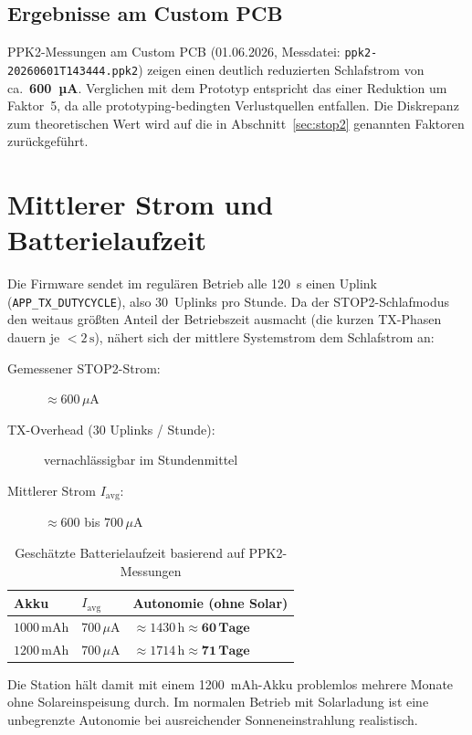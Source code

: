 \subsection*{Ergebnisse am Custom PCB}

PPK2-Messungen am Custom PCB (01.06.2026, Messdatei: \texttt{ppk2-20260601T143444.ppk2}) zeigen einen deutlich reduzierten Schlafstrom von ca.\ \textbf{600~µA}. Verglichen mit dem Prototyp entspricht das einer Reduktion um Faktor~5, da alle prototyping-bedingten Verlustquellen entfallen. Die Diskrepanz zum theoretischen Wert wird auf die in Abschnitt~\ref{sec:stop2} genannten Faktoren zurückgeführt.

\section*{Mittlerer Strom und Batterielaufzeit}
\label{sec:stop2}

Die Firmware sendet im regulären Betrieb alle 120~s einen Uplink (\texttt{APP\_TX\_DUTYCYCLE}), also 30~Uplinks pro Stunde. Da der STOP2-Schlafmodus den weitaus größten Anteil der Betriebszeit ausmacht (die kurzen TX-Phasen dauern je $< 2\,\text{s}$), nähert sich der mittlere Systemstrom dem Schlafstrom an:

\begin{description}
  \item[Gemessener STOP2-Strom:] $\approx 600\,\mu\text{A}$
  \item[TX-Overhead (30 Uplinks / Stunde):] vernachlässigbar im Stundenmittel
  \item[Mittlerer Strom $I_{\text{avg}}$:] $\approx 600$ bis $700\,\mu\text{A}$
\end{description}

\begin{table}[H]
  \centering
  \begin{tabular}{lll}
    \hline
    \textbf{Akku} & \textbf{$I_{\text{avg}}$} & \textbf{Autonomie (ohne Solar)} \\
    \hline
    $1000\,\text{mAh}$ & $700\,\mu\text{A}$ & $\approx 1430\,\text{h} \approx \mathbf{60\,\text{Tage}}$ \\
    $1200\,\text{mAh}$ & $700\,\mu\text{A}$ & $\approx 1714\,\text{h} \approx \mathbf{71\,\text{Tage}}$ \\
    \hline
  \end{tabular}
  \caption{Geschätzte Batterielaufzeit basierend auf PPK2-Messungen}
  \label{tab:battery-life}
\end{table}

Die Station hält damit mit einem 1200~mAh-Akku problemlos mehrere Monate ohne Solareinspeisung durch. Im normalen Betrieb mit Solarladung ist eine unbegrenzte Autonomie bei ausreichender Sonneneinstrahlung realistisch.
